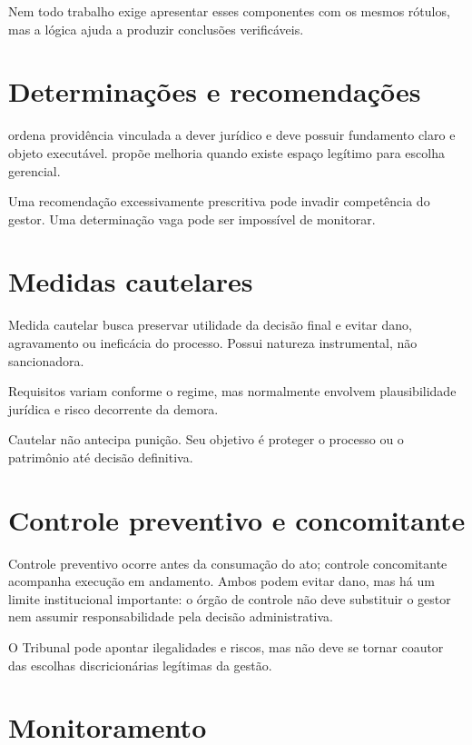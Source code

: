 Nem todo trabalho exige apresentar esses componentes com os mesmos rótulos, mas a lógica ajuda a produzir conclusões verificáveis.

\section{Determinações e recomendações}

 ordena providência vinculada a dever jurídico e deve possuir fundamento claro e objeto executável.  propõe melhoria quando existe espaço legítimo para escolha gerencial.

Uma recomendação excessivamente prescritiva pode invadir competência do gestor. Uma determinação vaga pode ser impossível de monitorar.

\section{Medidas cautelares}

Medida cautelar busca preservar utilidade da decisão final e evitar dano, agravamento ou ineficácia do processo. Possui natureza instrumental, não sancionadora.

Requisitos variam conforme o regime, mas normalmente envolvem plausibilidade jurídica e risco decorrente da demora.

\begin{atencao}
Cautelar não antecipa punição. Seu objetivo é proteger o processo ou o patrimônio até decisão definitiva.
\end{atencao}

\section{Controle preventivo e concomitante}

Controle preventivo ocorre antes da consumação do ato; controle concomitante acompanha execução em andamento. Ambos podem evitar dano, mas há um limite institucional importante: o órgão de controle não deve substituir o gestor nem assumir responsabilidade pela decisão administrativa.

O Tribunal pode apontar ilegalidades e riscos, mas não deve se tornar coautor das escolhas discricionárias legítimas da gestão.

\section{Monitoramento}

